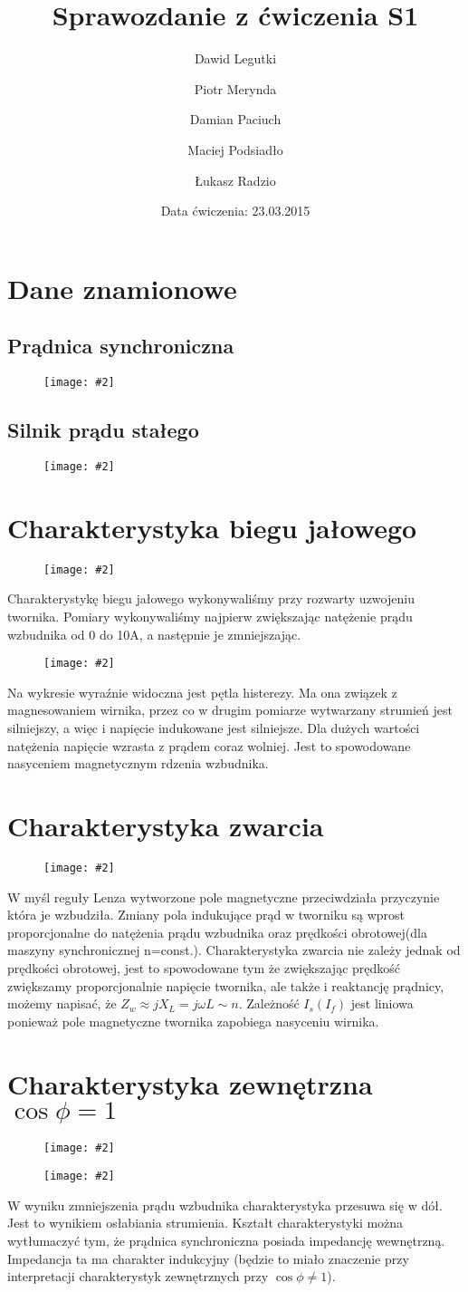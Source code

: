 \documentclass[12pt]{article}
\title{Sprawozdanie z ćwiczenia S1}
\author{ 
Dawid Legutki \and Piotr Merynda \and Damian Paciuch \and Maciej Podsiadło \and Łukasz Radzio}
\date{Data ćwiczenia: 23.03.2015}
\newcommand{\obrazek}[2]
{
	\begin{figure}[H]
	\centering
	\texttt{[image: \#2]}
	\end{figure}
}
\begin{document}
\maketitle
\section{Dane znamionowe}
\subsection{Prądnica synchroniczna}
	\obrazek{8}{tabele/pradnica}
	\subsection{Silnik prądu stałego}
	\obrazek{8}{tabele/silnik}
\section{Charakterystyka biegu jałowego}
	\obrazek{5}{tabele/jalowy}
Charakterystykę biegu jałowego wykonywaliśmy przy rozwarty uzwojeniu twornika. Pomiary wykonywaliśmy najpierw zwiększając natężenie prądu wzbudnika od 0 do 10A, a następnie je zmniejszając.
	\obrazek{12}{wykresy/jalowy}
Na wykresie wyraźnie widoczna jest pętla histerezy. Ma ona związek z magnesowaniem wirnika, przez co w drugim pomiarze wytwarzany strumień jest silniejszy, a więc i napięcie indukowane jest silniejsze. 
Dla dużych wartości natężenia napięcie wzrasta z prądem coraz wolniej. Jest to spowodowane nasyceniem magnetycznym rdzenia wzbudnika.

\section{Charakterystyka zwarcia}
	\obrazek{12}{wykresy/zwarcie}
	W myśl reguły Lenza wytworzone pole magnetyczne przeciwdziała przyczynie która je wzbudziła. Zmiany pola indukujące prąd w tworniku są wprost proporcjonalne do natężenia prądu wzbudnika oraz prędkości obrotowej(dla maszyny synchronicznej n=const.). Charakterystyka zwarcia nie zależy jednak od prędkości obrotowej, jest to spowodowane tym że zwiększając prędkość zwiększamy proporcjonalnie napięcie twornika, ale także i reaktancję prądnicy, możemy napisać, że $Z_w \approx jX_L= j\omega L \sim n$. 
	Zależność $I_s(I_f)$ jest liniowa ponieważ pole magnetyczne twornika zapobiega nasyceniu wirnika.
	
\section{Charakterystyka zewnętrzna $\cos\phi=1$}
	\obrazek{8}{tabele/cosfi1}
	\obrazek{12}{wykresy/cosfi1} 
W wyniku zmniejszenia prądu wzbudnika charakterystyka przesuwa się w dół. Jest to wynikiem osłabiania strumienia.
Kształt charakterystyki można wytłumaczyć tym, że prądnica synchroniczna posiada impedancję wewnętrzną. Impedancja ta ma charakter indukcyjny (będzie to miało znaczenie przy interpretacji charakterystyk zewnętrznych przy $\cos \phi \neq 1$).
\end{document}
